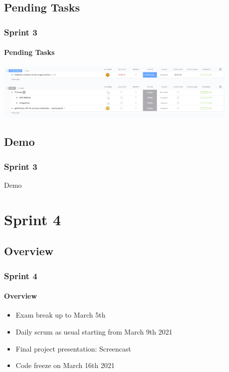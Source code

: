 \documentclass[english,hangout]{beamer}
\begin{document}
\subsection{Pending Tasks}

\begin{frame}[fragile]
 \frametitle{Sprint 3}
 \framesubtitle{Pending Tasks}
\begin{center}
        \vspace{-1.2em}
            \includegraphics[height=2.7cm]{Sprint3Pendin.png}
        \end{center}
\end{frame}

\subsection{Demo}

\begin{frame}[fragile]
 \frametitle{Sprint 3}
    \begin{center}
        \vspace{-1.2em}
            Demo
        \end{center}
\end{frame}

\section{Sprint 4}

\subsection{Overview}

\begin{frame}[fragile]
 \frametitle{Sprint 4}
 \framesubtitle{Overview}
    \begin{itemize}
        \item Exam break up to March 5th
        \item Daily scrum as usual starting from March 9th 2021
        \item Final project presentation: Screencast
        \item Code freeze on March 16th 2021
    \end{itemize}
\end{frame}
\end{document}
